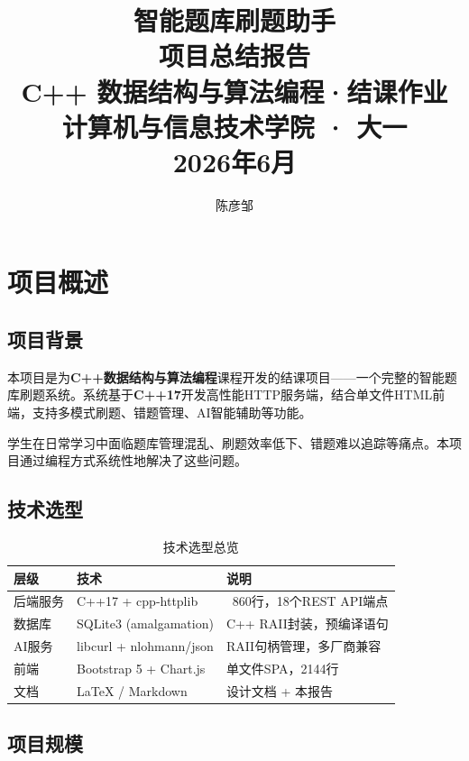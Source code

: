 \documentclass[12pt,a4paper]{ctexart}
\title{
    \vspace{4cm}
    {\Huge\bfseries 智能题库刷题助手}\\[0.8cm]
    {\Large 项目总结报告}\\[1.5cm]
    {\large C++ 数据结构与算法编程·结课作业}\\[0.5cm]
    {\large 计算机与信息技术学院 · 大一}\\[0.5cm]
    {\large 2026年6月}
}
\author{陈彦邹}
\date{}
\begin{document}
\maketitle
\thispagestyle{empty}

\newpage
\tableofcontents
\thispagestyle{empty}

\newpage

\section{项目概述}

\subsection{项目背景}
本项目是为\textbf{C++数据结构与算法编程}课程开发的结课项目——一个完整的智能题库刷题系统。系统基于\textbf{C++17}开发高性能HTTP服务端，结合单文件HTML前端，支持多模式刷题、错题管理、AI智能辅助等功能。

学生在日常学习中面临题库管理混乱、刷题效率低下、错题难以追踪等痛点。本项目通过编程方式系统性地解决了这些问题。

\subsection{技术选型}

\begin{table}[h]
\centering
\begin{tabular}{|l|l|l|}
\hline
\textbf{层级}   & \textbf{技术}              & \textbf{说明}             \\ \hline
后端服务        & C++17 + cpp-httplib       & ~860行，18个REST API端点   \\ \hline
数据库          & SQLite3 (amalgamation)    & C++ RAII封装，预编译语句   \\ \hline
AI服务          & libcurl + nlohmann/json   & RAII句柄管理，多厂商兼容   \\ \hline
前端            & Bootstrap 5 + Chart.js    & 单文件SPA，2144行          \\ \hline
文档            & \LaTeX{} / Markdown       & 设计文档 + 本报告          \\ \hline
\end{tabular}
\caption{技术选型总览}
\end{table}

\subsection{项目规模}
\end{document}
